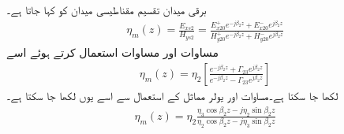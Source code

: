 برقی میدان تقسیم مقناطیسی  میدان کو   کہا جاتا ہے۔ 
\begin{align}
\eta_m(z)=\frac{E_{xs2}}{H_{ys2}}=\frac{E_{x20}^+ e^{-j\beta_2 z}+E_{x20}^- e^{j \beta_2 z}}{H_{y20}^+ e^{-j\beta_2 z}+H_{y20}^- e^{j \beta_2 z}}
\end{align}
مساوات  اور مساوات  استعمال کرتے ہوئے اسے
\begin{align}
\eta_m(z)=\eta_2 \left[\frac{e^{-j \beta_2 z}+\Gamma_{23} e^{j \beta_2 z}}{e^{-j \beta_2 z}-\Gamma_{23} e^{j \beta_2 z}} \right]
\end{align}
لکھا جا سکتا ہے۔مساوات  اور یولر مماثل کے استعمال سے اسے یوں لکھا جا سکتا ہے۔
\begin{align}\label{مساوات_مستوی_موج_کی_رکاوٹ}
\eta_m(z)=\eta_2 \frac{\eta_3 \cos \beta_2 z - j \eta_2 \sin \beta_2 z}{\eta_2 \cos \beta_2 z - j \eta_3 \sin \beta_2 z}
\end{align}

